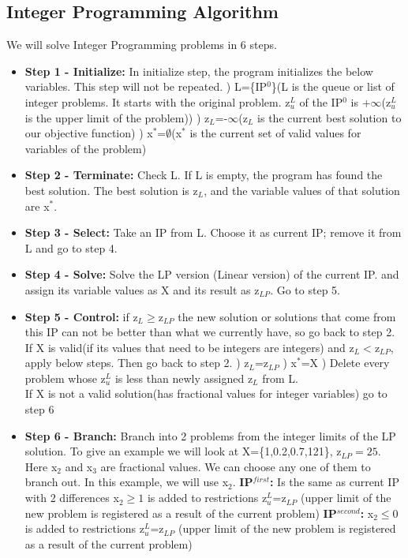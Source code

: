 \subsection{Integer Programming Algorithm}
We will solve Integer Programming problems in 6 steps.
\begin{itemize}
	\item \textbf{Step 1 - Initialize:} In initialize step, the program initializes the below variables. This step will not be repeated.
	) L=\{IP$^0$\}\quad (L is the queue or list of integer problems. It starts with the original problem. z$_u^L$ of the IP$^0$ is +$\infty$(z$_u^L$ is the upper limit of the problem))
	) z$_L$=-$\infty$\quad (z$_L$ is the current best solution to our objective function)
	) x$^*$=$\emptyset$\quad (x$^*$ is the current set of valid values for variables of the problem)
	\item \textbf{Step 2 - Terminate:} Check L. If L is empty, the program has found the best solution. The best solution is z$_L$, and the variable values of that solution are x$^*$.
	\item \textbf{Step 3 - Select:} Take an IP from L. Choose it as current IP; remove it from L and go to step 4.
	\item \textbf{Step 4 - Solve:} Solve the LP version (Linear version) of the current IP. and assign its variable values as X and its result as z$_{LP}$. Go to step 5.
	\item \textbf{Step 5 - Control:} if z$_L\geq $z$_{LP}$ the new solution or solutions that come from this IP can not be better than what we currently have, so go back to step 2.\\
	If X is valid(if its values that need to be integers are integers) and z$_L<$z$_{LP}$, apply below steps. Then go back to step 2.
	) z$_L$=z$_{LP}$
	) x$^*$=X\quad
	) Delete every problem whose z$_u^L$ is less than newly assigned z$_L$ from L. 
	\\
	If X is not a valid solution(has fractional values for integer variables) go to step 6 
	\item \textbf{Step 6 - Branch:} Branch into 2 problems from the integer limits of the LP solution. To give an example we will look at X=\{1,0.2,0.7,121\}, z$_{LP}=25$. Here x$_2$ and x$_3$ are fractional values. We can choose any one of them to branch out. In this example, we will use x$_2$.
		\subitem\textbf{IP$^{first}$:} Is the same as current IP with 2 differences
			\subsubitem x$_2\geq1$ \quad is added to restrictions
			\subsubitem z$_u^L$=z$_{LP}$ \quad (upper limit of the new problem is registered as a result of the current problem)
		\subitem\textbf{IP$^{second}$:}
			\subsubitem x$_2\leq0$ \quad is added to restrictions
			\subsubitem z$_u^L$=z$_{LP}$ \quad (upper limit of the new problem is registered as a result of the current problem)
		
\end{itemize}
